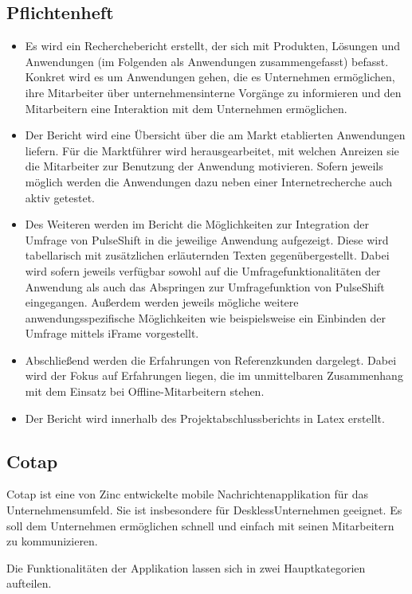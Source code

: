 \subsection{Pflichtenheft}
\begin{itemize}
\item Es wird ein Recherchebericht erstellt, der sich mit Produkten, Lösungen und Anwendungen (im Folgenden als Anwendungen zusammengefasst) befasst. Konkret wird es um Anwendungen gehen, die es Unternehmen ermöglichen, ihre Mitarbeiter über unternehmensinterne Vorgänge zu informieren und den Mitarbeitern eine Interaktion mit dem Unternehmen ermöglichen.
\item Der Bericht wird eine Übersicht über die am Markt etablierten Anwendungen liefern. Für die Marktführer wird herausgearbeitet, mit welchen Anreizen sie die Mitarbeiter zur Benutzung der Anwendung motivieren. Sofern jeweils möglich werden die Anwendungen dazu neben einer Internetrecherche auch aktiv getestet.
\item Des Weiteren werden im Bericht die Möglichkeiten zur Integration der Umfrage von PulseShift in die jeweilige Anwendung aufgezeigt. Diese wird tabellarisch mit zusätzlichen erläuternden Texten gegenübergestellt. Dabei wird sofern jeweils verfügbar sowohl auf die Umfragefunktionalitäten der Anwendung als auch das Abspringen zur Umfragefunktion von PulseShift eingegangen. Außerdem werden jeweils mögliche weitere anwendungsspezifische Möglichkeiten wie beispielsweise ein Einbinden der Umfrage mittels iFrame vorgestellt.
\item Abschließend werden die Erfahrungen von Referenzkunden dargelegt. Dabei wird der Fokus auf Erfahrungen liegen, die im unmittelbaren Zusammenhang mit dem Einsatz bei Offline-Mitarbeitern stehen.
\item Der Bericht wird innerhalb des Projektabschlussberichts in Latex erstellt.
\end{itemize}

\subsection{Cotap}
Cotap ist eine von Zinc entwickelte mobile Nachrichtenapplikation für das Unternehmensumfeld. Sie ist insbesondere für \glqq Deskless\grqq Unternehmen geeignet. Es soll dem Unternehmen ermöglichen schnell und einfach mit seinen Mitarbeitern zu kommunizieren. 

Die Funktionalitäten der Applikation lassen sich in zwei Hauptkategorien aufteilen. 

